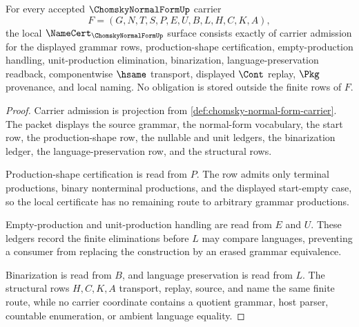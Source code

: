 \begin{theorem}
\label{thm:chomsky-normal-form-namecert-obligations}
For every accepted $\ChomskyNormalFormUp$ carrier
$$
F=(G,N,T,S,P,E,U,B,L,H,C,K,A),
$$
the local $\NameCert_{\ChomskyNormalFormUp}$ surface consists exactly of carrier admission for the displayed grammar rows, production-shape certification, empty-production handling, unit-production elimination, binarization, language-preservation readback, componentwise $\hsame$ transport, displayed $\Cont$ replay, $\Pkg$ provenance, and local naming. No obligation is stored outside the finite rows of $F$.
\end{theorem}
\begin{proof}
Carrier admission is projection from \autoref{def:chomsky-normal-form-carrier}. The packet displays the source grammar, the normal-form vocabulary, the start row, the production-shape row, the nullable and unit ledgers, the binarization ledger, the language-preservation row, and the structural rows.

Production-shape certification is read from $P$. The row admits only terminal productions, binary nonterminal productions, and the displayed start-empty case, so the local certificate has no remaining route to arbitrary grammar productions.

Empty-production and unit-production handling are read from $E$ and $U$. These ledgers record the finite eliminations before $L$ may compare languages, preventing a consumer from replacing the construction by an erased grammar equivalence.

Binarization is read from $B$, and language preservation is read from $L$. The structural rows $H,C,K,A$ transport, replay, source, and name the same finite route, while no carrier coordinate contains a quotient grammar, host parser, countable enumeration, or ambient language equality.
\end{proof}

